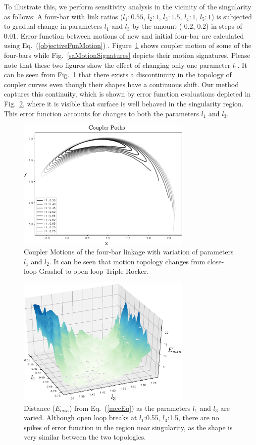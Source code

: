 \documentclass[twocolumn,10pt]{asme2e}
\newcommand{\req}[1]{(\ref{#1})}
\begin{document}
To illustrate this, we perform sensitivity analysis in the vicinity of the singularity as follows:
A four-bar with link ratios ($l_1:0.55$, $l_2:1$, $l_3:1.5$, $l_4:1$, $l_5:1$) is subjected to gradual change in parameters $l_1$ and $l_3$ by the amount (-0.2, 0.2) in steps of 0.01.
Error function between motions of new and initial four-bar are calculated using Eq.~\req{objectiveFunMotion} .
Figure~\ref{saCouplerCurves} shows coupler motion of some of the four-bars while Fig.~\ref{saMotionSignatures} depicts their motion signatures. Please note that these two figures show the effect of changing only one parameter $l_1$.
It can be seen from Fig.~\ref{saCouplerCurves} that there exists a discontinuity in the topology of coupler curves even though their shapes have a continuous shift.
Our method captures this continuity, which is shown by error function evaluations depicted in Fig.~\ref{saErrorFunction}, where it is visible that surface is well behaved in the singularity region. This error function accounts for changes to both the parameters $l_1$ and $l_3$.

\begin{figure}
\centering
\includegraphics[width=240pt]{figure/fig_sa_coupler_curves.eps}
  \caption{Coupler Motions of the four-bar linkage with variation of parameters $l_1$ and $l_2$. It can be seen that motion topology changes from close-loop Grashof to open loop Triple-Rocker.}
\label{saCouplerCurves}
\end{figure}

\begin{figure}
\centering
\includegraphics[width=240pt]{figure/fig_sa_distance_function.eps}
  \caption{Distance ($E_{min}$) from Eq.~\req{mccEq} as the parameters $l_1$ and $l_3$ are varied. Although open loop breaks at $l_1$:0.55, $l_3$:1.5, there are no spikes of error function in the region near singularity, as the shape is very similar between the two topologies.}
\label{saErrorFunction}
\end{figure}
\end{document}
